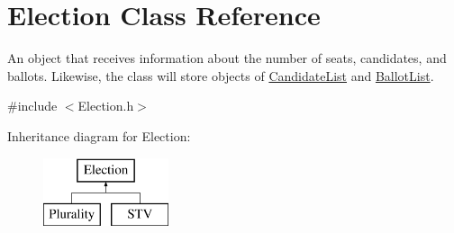\hypertarget{class_election}{}\section{Election Class Reference}
\label{class_election}


An object that receives information about the number of seats, candidates, and ballots. Likewise, the class will store objects of \mbox{\hyperlink{class_candidate_list}{Candidate\+List}} and \mbox{\hyperlink{class_ballot_list}{Ballot\+List}}.  




{\ttfamily \#include $<$Election.\+h$>$}

Inheritance diagram for Election\+:\begin{figure}[H]
\begin{center}
\leavevmode
\includegraphics[height=2.000000cm]{class_election}
\end{center}
\end{figure}
